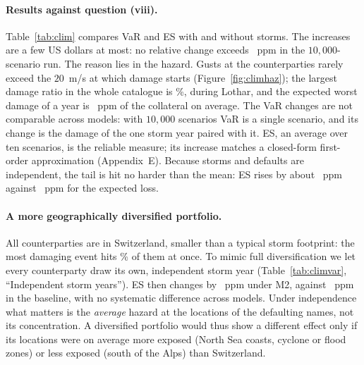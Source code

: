 \begin{table}[tb]
\caption{Question (xi): $99.9\%$ VaR and ES without the storm overlay (USD) and their increase with it, in USD and in parts per million (ppm; $1$~ppm $=0.0001\%$), $\phi_k=0.5$.}
\label{tab:clim}
\centering
{}
\end{table}

\paragraph{Results against question (viii).}
Table~\ref{tab:clim} compares VaR and ES with and without storms. The increases are a few US dollars at most: no relative change exceeds ~ppm in the $10{,}000$-scenario run. The reason lies in the hazard. Gusts at the counterparties rarely exceed the $20$~m/s at which damage starts (Figure~\ref{fig:climhaz}); the largest damage ratio in the whole catalogue is \%, during Lothar, and the expected worst damage of a year is ~ppm of the collateral on average. The VaR changes are not comparable across models: with $10{,}000$ scenarios VaR is a single scenario, and its change is the damage of the one storm year paired with it. ES, an average over ten scenarios, is the reliable measure; its increase matches a closed-form first-order approximation (Appendix~E). Because storms and defaults are independent, the tail is hit no harder than the mean: ES rises by about ~ppm against ~ppm for the expected loss.

\begin{table}[tb]
\caption{Reference run ($N=2{,}000{,}000$): increase of the expected loss (M2), VaR and ES due to the storm overlay (ppm), for the baseline and five variants. First row: first-order approximation. ES is the reliable measure; the VaR columns are dominated by a single scenario.}
\label{tab:climvar}
\centering
{}
\end{table}

\paragraph{A more geographically diversified portfolio.}
All counterparties are in Switzerland, smaller than a typical storm footprint: the most damaging event hits \% of them at once. To mimic full diversification we let every counterparty draw its own, independent storm year (Table~\ref{tab:climvar}, ``Independent storm years''). ES then changes by ~ppm under M2, against ~ppm in the baseline, with no systematic difference across models. Under independence what matters is the \emph{average} hazard at the locations of the defaulting names, not its concentration. A diversified portfolio would thus show a different effect only if its locations were on average more exposed (North Sea coasts, cyclone or flood zones) or less exposed (south of the Alps) than Switzerland.

